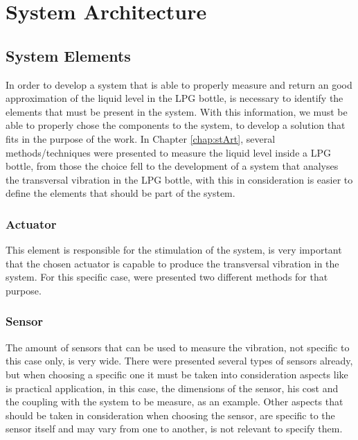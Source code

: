 \cleardoublepage
\chapter{System Architecture} \label{chap:sysArch}
\section{System Elements}
In order to develop a system that is able to properly measure and return an good approximation of the liquid level in the LPG bottle, is necessary to identify the elements that must be present in the system. With this information, we must be able to properly chose the components to the system, to develop a solution that fits in the purpose of the work. In Chapter \ref{chap:stArt}, several methods/techniques were presented to measure the liquid level inside a LPG bottle, from those the choice fell to the development of a system that analyses the transversal vibration in the LPG bottle, with this in consideration is easier to define the elements that should be part of the system. 
\subsection*{Actuator}
This element is  responsible for the stimulation of the system, is very important that the chosen actuator is capable to produce the transversal vibration in the system. For this specific case, were presented two different methods for that purpose.
\subsection*{Sensor}
The amount of sensors that can be used to measure the vibration, not specific to this case only, is very wide. There were presented several types of sensors already, but when choosing a specific one it must be taken into consideration aspects like is practical application, in this case, the dimensions of the sensor, his cost and the coupling with the system to be measure, as an example. Other aspects that should be taken in consideration when choosing the sensor, are specific to the sensor itself and may vary from one to another, is not relevant to specify them. 
